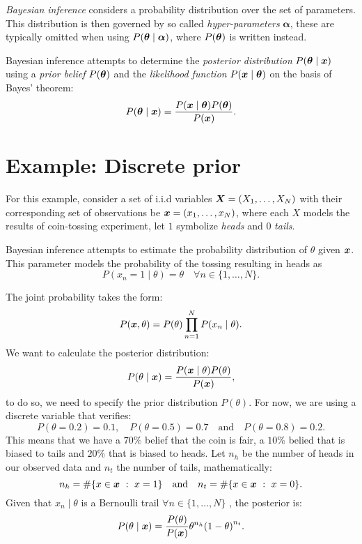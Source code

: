 

\emph{Bayesian inference} considers a probability distribution over the set of parameters. This distribution is then governed by so called \emph{hyper-parameters} \(\bm{\alpha}\), these are typically omitted when using \(P(\bm{\theta} \mid \bm{\alpha})\), where \(P(\bm{\theta})\) is written instead.

Bayesian inference attempts to determine the \emph{posterior distribution} \(P(\bm{\theta} \mid \bm{x})\) using a \emph{prior belief} \(P(\bm{\theta})\) and the \emph{likelihood function} \(P(\bm{x} \mid \bm{\theta})\) on the basis of Bayes' theorem:
\[
  P(\bm{\theta} \mid  \bm{x}) = \frac{P(\bm{x}  \mid  \bm{\theta})P(\bm{\theta})}{P(\bm{x})}.
\]


\section{Example: Discrete prior}

For this example, consider a set of i.i.d variables \(\bm{X} = (X_{1},\dots, X_{N})\) with their corresponding set of observations be \(\bm{x} = (x_{1},\dots,x_{N})\), where each \(X\) models the results of coin-tossing experiment, let \(1\) symbolize \emph{heads} and \(0\) \emph{tails}.

Bayesian inference attempts to estimate the probability distribution of \(\theta\) given \(\bm{x}\). This parameter models the probability of the tossing resulting in heads as
\[
P(x_n = 1  \mid  \theta) = \theta \quad \forall n \in \{1,\dots,N\}.
\]

The joint probability takes the form:
\[
  P(\bm{x},\theta) = P(\theta)\prod_{n=1}^N P(x_n \mid \theta).
\]
We want to calculate the posterior distribution:
\[
  P(\theta \mid \bm{x}) = \frac{P(\bm{x} \mid \theta)P(\theta)}{P(\bm{x})},
\]
to do so, we need to specify the prior distribution \(P(\theta)\). For now, we are using a discrete variable that verifies:
\[
  P(\theta = 0.2) = 0.1, \quad P(\theta = 0.5) = 0.7 \quad \text{and} \quad P(\theta = 0.8) = 0.2.
\]
This means that we have a \(70\%\) belief that the coin is fair, a \(10\%\)
belied that is biased to tails and \(20\%\) that is biased to heads. Let \(n_h\) be the number of heads in our observed data and \(n_t\)
the number of tails, mathematically:
\[
  n_{h} = \#\{x \in \bm{x} \ : \ x = 1\} \quad \text{and} \quad n_{t} = \#\{x \in \bm{x} \ : \ x = 0\}.
\]
Given that \(x_{n} \mid \theta\) is a Bernoulli trail \(\forall n \in \{1,\dots,N\}\) , the posterior is:
\[
  P(\theta  \mid \bm{x}) = \frac{P(\theta)}{P(\bm{x})} \theta^{n_h}{(1-\theta)}^{n_t}.
\]

